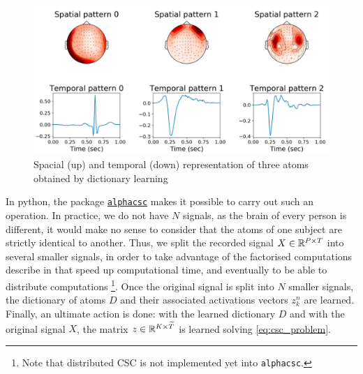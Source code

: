 \begin{figure}[h!]
    \centering
    \includegraphics[scale=0.35]{pics/atom_location_and_form.png}
    \caption{Spacial (up) and temporal (down) representation of three atoms obtained by dictionary learning}
    \label{fig:atom_location_and_form}
\end{figure}

In python, the package \href{https://alphacsc.github.io/index.html}{\texttt{alphacsc}} makes it possible to carry out such an operation.
In practice, we do not have $N$ signals, as the brain of every person is different, it would make no sense to consider that the atoms of one subject are strictly identical to another.
Thus, we split the recorded signal $X\in\mathbb{R}^{P\times T}$ into several smaller signals, in order to take advantage of the factorised computations describe in \citep{dupre2018multivariate} that speed up computational time, and eventually to be able to distribute computations \citep{moreau2019distributed}\footnote{Note that distributed CSC is not implemented yet into \texttt{alphacsc}.}.
Once the original signal is split into $N$ smaller signals, the dictionary of atoms $D$ and their associated activations vectors $z_k^n$ are learned.
Finally, an ultimate action is done: with the learned dictionary $D$ and with the original signal $X$, the matrix $z \in \mathbb{R}^{K\times \widetilde{T}}$ is learned solving \eqref{eq:csc_problem}.

    
